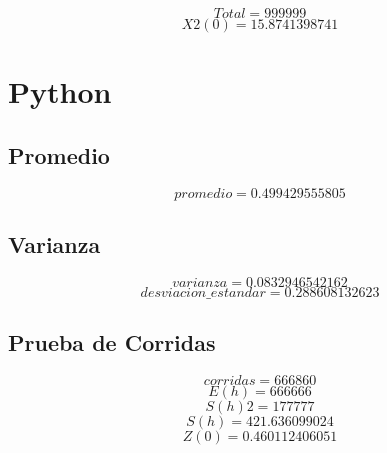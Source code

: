 \documentclass{article}
\begin{document}
$$
Total = 999999
$$
$$
X2(0) = 15.8741398741
$$
\section{Python}


\subsection{Promedio}
$$
promedio = 0.499429555805
$$


\subsection{Varianza}
$$
varianza = 0.0832946542162
$$
$$
desviacion\_estandar = 0.288608132623
$$


\subsection{Prueba de Corridas}
$$
corridas = 666860
$$
$$
E(h) = 666666
$$
$$
S(h)2 = 177777
$$
$$
S(h) = 421.636099024
$$
$$
Z(0) = 0.460112406051
$$
\end{document}
